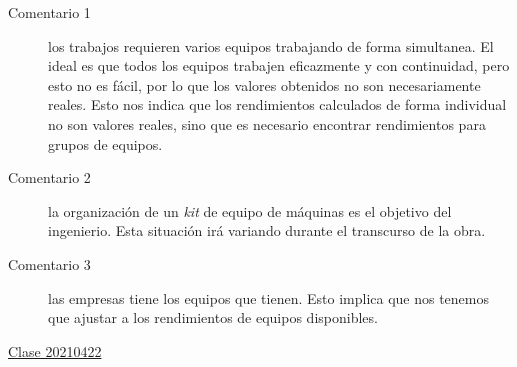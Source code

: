 \documentclass[../main.tex]{subfiles}
\begin{document}
\begin{description}
  \item[Comentario 1] los trabajos requieren varios equipos trabajando de forma
    simultanea. El ideal es que todos los equipos trabajen eficazmente y con
    continuidad, pero esto no es fácil, por lo que los valores obtenidos no son
    necesariamente reales. Esto nos indica que los rendimientos calculados de
    forma individual no son valores reales, sino que es necesario encontrar 
    rendimientos para grupos de equipos.

  \item[Comentario 2] la organización de un \textit{kit} de equipo de máquinas
    es el objetivo del ingenierio. Esta situación irá variando durante el transcurso
    de la obra. 

  \item[Comentario 3] las empresas tiene los equipos que tienen. Esto implica que
    nos tenemos que ajustar a los rendimientos de equipos disponibles. 
\end{description}


\href{https://youtu.be/zlrogWSgd9k}{Clase 20210422}
\end{document}
